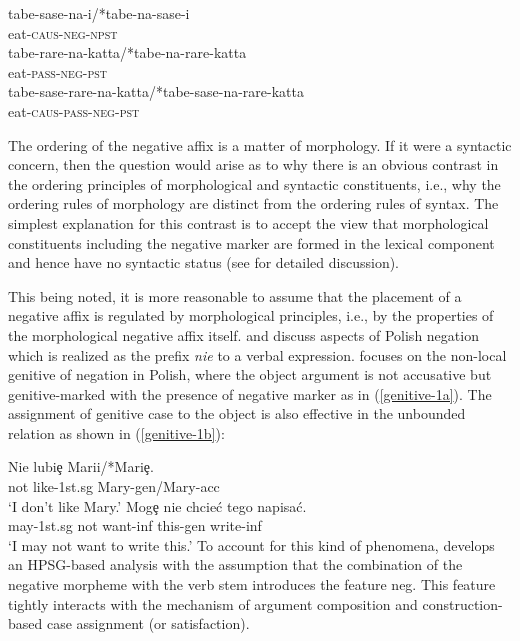 \documentclass[output=paper
                ,modfonts
                		,nonflat
	        ,collection
	        ,collectionchapter
	        ,collectiontoclongg
 	        ,biblatex
                ,babelshorthands
                ,newtxmath
                ,draftmode
                ,colorlinks, citecolor=brown
]{./langsci/langscibook}
\begin{document}
{\begin{exe}
\begin{xlist}
\begin{exe}
\begin{xlist}
\eal
\ex
\gll tabe-sase-na-i/*tabe-na-sase-i \\
     eat-\textsc{caus}-\textsc{neg}-\textsc{npst} \\

\ex
\gll tabe-rare-na-katta/*tabe-na-rare-katta \\
     eat-\textsc{pass}-\textsc{neg}-\textsc{pst} \\

\ex
\gll tabe-sase-rare-na-katta/*tabe-sase-na-rare-katta \\
     eat-\textsc{caus}-\textsc{pass}-\textsc{neg}-\textsc{pst} \\
\zl

\noindent
The ordering of the negative affix is a matter of morphology.
If it were a syntactic concern, then
the question would arise as to why
there is an obvious contrast in the ordering principles
of morphological and syntactic constituents, i.e., why the ordering
rules of morphology are distinct from the ordering rules of syntax. The
simplest explanation for this contrast is to accept
the view that morphological constituents including the negative marker
are formed in the lexical component and hence have no syntactic
status (see \citealt{Kim:00} for detailed discussion).

This being noted, it is more reasonable to assume that the placement of a
negative affix is regulated by morphological principles, i.e., by
the properties of the morphological negative affix itself.
\citet{PK:99} and \citet{Prz:00, Prz:01}
discuss aspects of Polish negation which is realized as the prefix
  {\it nie} to a verbal expression.
 \citet{Prz:00} focuses on the non-local genitive of negation in Polish, where the object argument is not accusative but genitive-marked with the presence of negative marker as in (\ref{genitive-1a}). The assignment of genitive case to the object is also effective in
  the unbounded relation as shown in (\ref{genitive-1b}):

\eal
\ex \label{genitive-1a}
\gll Nie lubi\c{e} Marii/*Mari\c{e}. \\
     not like-1st.{\sc sg} Mary-{\sc gen}/Mary-{\sc acc}\\
\glt `I don't like Mary.'
\ex \label{genitive-1b}
\gll Mog\c{e} nie chcie\'{c} tego napisa\'{c}. \\
     may-1st.{\sc sg} not want-{\sc inf} this-{\sc gen} write-{\sc inf}\\
\glt `I may not want to write this.'
\zl
To account for this kind of phenomena, \citet{Prz:00} develops
an HPSG-based analysis with the assumption that the combination of the
negative morpheme with the verb stem introduces the feature {\sc neg}. This feature
tightly interacts with the mechanism of argument composition and construction-based case assignment (or satisfaction).


\end{xlist}
\end{exe}
\end{xlist}
\end{exe}}
\end{document}
